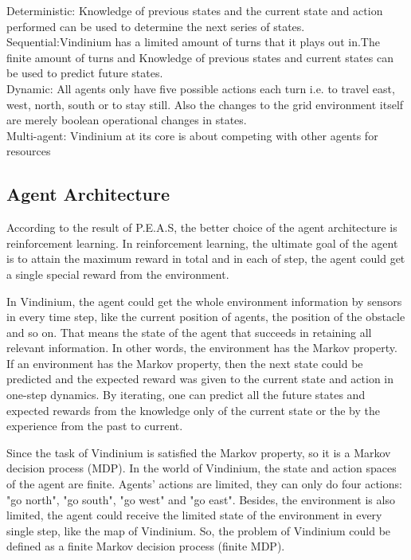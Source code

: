 Deterministic: Knowledge of previous states and the current state and action performed can be used to determine the next series of states. \\
  
Sequential:Vindinium has a limited amount of turns that it plays out in.The finite amount of turns and Knowledge of previous states and current states can be used to predict future states.\\


Dynamic: All agents only have five possible actions each turn i.e. to travel east, west, north, south or to stay still. Also the changes to the grid environment itself are merely boolean operational changes in states.\\

Multi-agent: Vindinium at its core is about competing with other agents for resources\\

\subsection{Agent Architecture}
According to the result of  P.E.A.S, the better choice of the agent architecture is reinforcement learning. In reinforcement learning, the ultimate goal of the agent is to attain the maximum reward in total and in each of step, the agent could get a single special reward from the environment.  

In Vindinium, the agent could get the whole environment information by sensors in every time step, like the current position of agents, the position of the obstacle and so on. That means the state of the agent that succeeds in retaining all relevant information. In other words, the environment has the Markov property. If an environment has the Markov property, then the next state could be predicted and the expected reward was given to the current state and action in one-step dynamics. By iterating, one can predict all the future states and expected rewards from the knowledge only of the current state or the by the experience from the past to current. 

Since the task of Vindinium is satisfied the Markov property, so it is a Markov decision process (MDP). In the world of Vindinium, the state and action spaces of the agent are finite.  Agents' actions are limited, they can only do four actions: "go north", "go south", "go west" and "go east".  Besides, the environment is also limited, the agent could receive the limited state of the environment in every single step, like the map of Vindinium. So, the problem of Vindinium could be defined as a finite Markov decision process (finite MDP).

